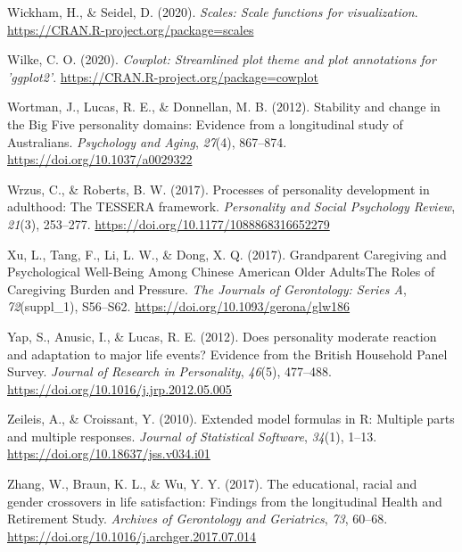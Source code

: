 \documentclass[
  english,
  man,floatsintext]{apa7}
\begin{document}
\leavevmode\hypertarget{ref-R-scales}{}%
Wickham, H., \& Seidel, D. (2020). \emph{Scales: Scale functions for visualization}. \url{https://CRAN.R-project.org/package=scales}

\leavevmode\hypertarget{ref-R-cowplot}{}%
Wilke, C. O. (2020). \emph{Cowplot: Streamlined plot theme and plot annotations for 'ggplot2'}. \url{https://CRAN.R-project.org/package=cowplot}

\leavevmode\hypertarget{ref-wortmanStabilityChangeBig2012}{}%
Wortman, J., Lucas, R. E., \& Donnellan, M. B. (2012). Stability and change in the Big Five personality domains: Evidence from a longitudinal study of Australians. \emph{Psychology and Aging}, \emph{27}(4), 867--874. \url{https://doi.org/10.1037/a0029322}

\leavevmode\hypertarget{ref-wrzusProcessesPersonalityDevelopment2017}{}%
Wrzus, C., \& Roberts, B. W. (2017). Processes of personality development in adulthood: The TESSERA framework. \emph{Personality and Social Psychology Review}, \emph{21}(3), 253--277. \url{https://doi.org/10.1177/1088868316652279}

\leavevmode\hypertarget{ref-xuGrandparentCaregivingPsychological2017}{}%
Xu, L., Tang, F., Li, L. W., \& Dong, X. Q. (2017). Grandparent Caregiving and Psychological Well-Being Among Chinese American Older AdultsThe Roles of Caregiving Burden and Pressure. \emph{The Journals of Gerontology: Series A}, \emph{72}(suppl\_1), S56--S62. \url{https://doi.org/10.1093/gerona/glw186}

\leavevmode\hypertarget{ref-yapDoesPersonalityModerate2012}{}%
Yap, S., Anusic, I., \& Lucas, R. E. (2012). Does personality moderate reaction and adaptation to major life events? Evidence from the British Household Panel Survey. \emph{Journal of Research in Personality}, \emph{46}(5), 477--488. \url{https://doi.org/10.1016/j.jrp.2012.05.005}

\leavevmode\hypertarget{ref-R-Formula}{}%
Zeileis, A., \& Croissant, Y. (2010). Extended model formulas in R: Multiple parts and multiple responses. \emph{Journal of Statistical Software}, \emph{34}(1), 1--13. \url{https://doi.org/10.18637/jss.v034.i01}

\leavevmode\hypertarget{ref-zhangEducationalRacialGender2017}{}%
Zhang, W., Braun, K. L., \& Wu, Y. Y. (2017). The educational, racial and gender crossovers in life satisfaction: Findings from the longitudinal Health and Retirement Study. \emph{Archives of Gerontology and Geriatrics}, \emph{73}, 60--68. \url{https://doi.org/10.1016/j.archger.2017.07.014}
\end{document}

